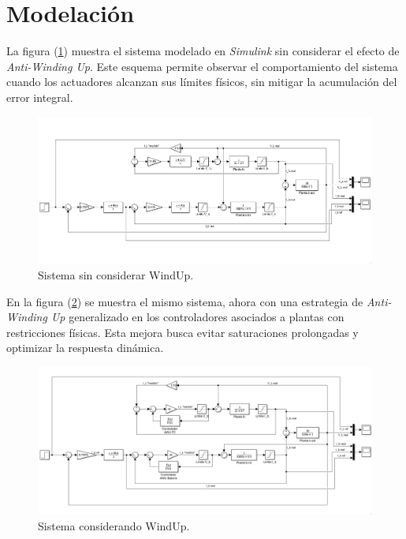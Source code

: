 \section{Modelación}

La figura (\ref{fig:modcsinAWU}) muestra el sistema modelado en \textit{Simulink} sin considerar el efecto de \textit{Anti-Winding Up}. Este esquema permite observar el comportamiento del sistema cuando los actuadores alcanzan sus límites físicos, sin mitigar la acumulación del error integral.

\begin{figure}[H]
\centering
\includegraphics[trim={0 2.5cm 0 1cm},clip,width=1\linewidth]{img/modelacion/SistsinAWU.png}
\caption{Sistema sin considerar WindUp.}
\label{fig:modcsinAWU}
\end{figure}

En la figura (\ref{fig:modconAWU}) se muestra el mismo sistema, ahora con una estrategia de \textit{Anti-Winding Up} generalizado en los controladores asociados a plantas con restricciones físicas. Esta mejora busca evitar saturaciones prolongadas y optimizar la respuesta dinámica.

\begin{figure}[H]
\centering
\includegraphics[width=1\linewidth]{img/modelacion/SistconAWU.png}
\caption{Sistema considerando WindUp.}
\label{fig:modconAWU}
\end{figure}
\newpage